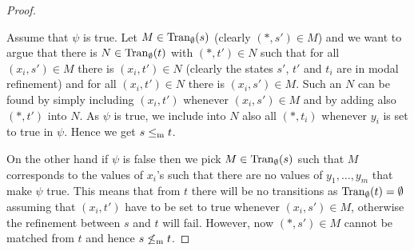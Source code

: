 \begin{proof}
\begin{center}
\end{center}
% 
% 

\smallskip

Assume that $\psi$ is true. Let 
$M \in \mathrm{Tran}_{\emptyset}(s)$ (clearly $(*,s') \in M$) and we want to argue
that there is $N \in \mathrm{Tran}_{\emptyset}(t)$ with $(*,t') \in N$ such that
for all $(x_i,s') \in M$  there is $(x_i,t') \in N$ (clearly the 
states $s'$, $t'$ and $t_i$ are in modal refinement)
and for all $(x_i,t') \in N$ there is $(x_i,s') \in M$.
Such an $N$ can be found by simply including 
$(x_i,t')$ whenever $(x_i,s') \in M$ and by adding
also $(*,t')$ into $N$. As $\psi$ is true, we include into $N$
also all $(*,t_i)$ whenever $y_i$ is set to true in $\psi$.
Hence we get $s \le_\mathrm m t$.

On the other hand if $\psi$ is false then we pick
$M \in \mathrm{Tran}_{\emptyset}(s)$ such that $M$ corresponds to the
values of $x_i$'s such that there are no values of 
$y_1, \ldots, y_m$ that make $\psi$ true. This means that from 
$t$ there will be no transitions as $\mathrm{Tran}_{\emptyset}(t)= \emptyset$
assuming that $(x_i,t')$ have to be set to true whenever
$(x_i,s') \in M$, otherwise the refinement between $s$ and $t$ will fail.
However, now $(*,s') \in M$ cannot be matched from 
$t$ and hence $s \not\le_\mathrm m t$.

\end{proof}

